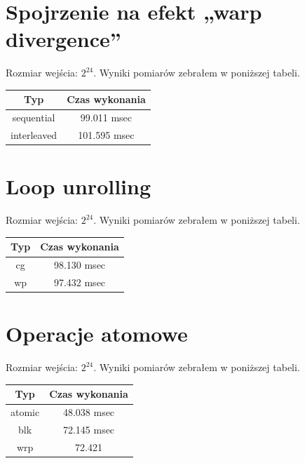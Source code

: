 \documentclass{article}
\begin{document}
    \newpage
    \section{Spojrzenie na efekt „warp divergence”}
    Rozmiar wejścia: $2^{24}$. Wyniki pomiarów zebrałem w poniższej tabeli.
            \begin{center}
            \begin{tabular}{|c|c|}
            \hline
             Typ & Czas wykonania \\
             \hline
            sequential & 99.011 msec \\
            interleaved & 101.595 msec\\
            \hline
            \end{tabular}
        \end{center}

    \section{Loop unrolling}
        Rozmiar wejścia: $2^{24}$. Wyniki pomiarów zebrałem w poniższej tabeli.
            \begin{center}
            \begin{tabular}{|c|c|}
            \hline
             Typ & Czas wykonania \\
             \hline
            cg & 98.130 msec \\
            wp & 97.432 msec\\
            \hline
            \end{tabular}
        \end{center}

    \section{Operacje atomowe}
        Rozmiar wejścia: $2^{24}$. Wyniki pomiarów zebrałem w poniższej tabeli.
            \begin{center}
            \begin{tabular}{|c|c|}
            \hline
             Typ & Czas wykonania \\
             \hline
            atomic & 48.038 msec \\
            blk & 72.145 msec\\
            wrp & 72.421\\
            \hline
            \end{tabular}
        \end{center}
\end{document}
